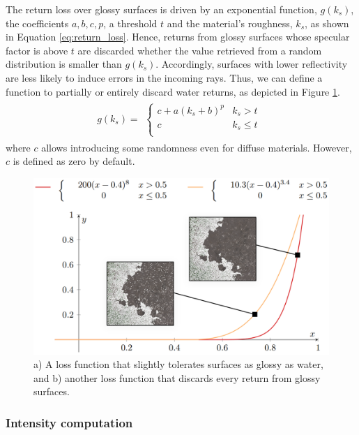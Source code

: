 The return loss over glossy surfaces is driven by an exponential function, $g(k_{s})$, the coefficients $a, b, c, p$, a threshold $\textit{t}$ and the material's roughness, $k_s$, as shown in Equation \ref{eq:return_loss}. Hence, returns from glossy surfaces whose specular factor is above $\textit{t}$ are discarded whether the value retrieved from a random distribution is smaller than $g(k_{s})$. Accordingly, surfaces with lower reflectivity are less likely to induce errors in the incoming rays. Thus, we can define a function to partially or entirely discard water returns, as depicted in Figure \ref{fig:glossy_loss}. 
\begin{gather}
    \label{eq:return_loss}
    g(k_{s}) = \begin{aligned}
        \begin{cases}
            c + a (k_{s} + b) ^ {p} &k_{s} > \textit{t}\\
            c &k_{s} \leq \textit{t}\\
        \end{cases}
    \end{aligned}
\end{gather}
where $c$ allows introducing some randomness even for diffuse materials. However, $c$ is defined as zero by default.

\begin{figure}
	\centering
	\includegraphics[width=.75\linewidth]{figs/lidar_simulation/glossy_loss.png}
	\caption{a) A loss function that slightly tolerates surfaces as glossy as water, and b) another loss function that discards every return from glossy surfaces. }
	\label{fig:glossy_loss}
\end{figure}

\subsubsection{Intensity computation}

